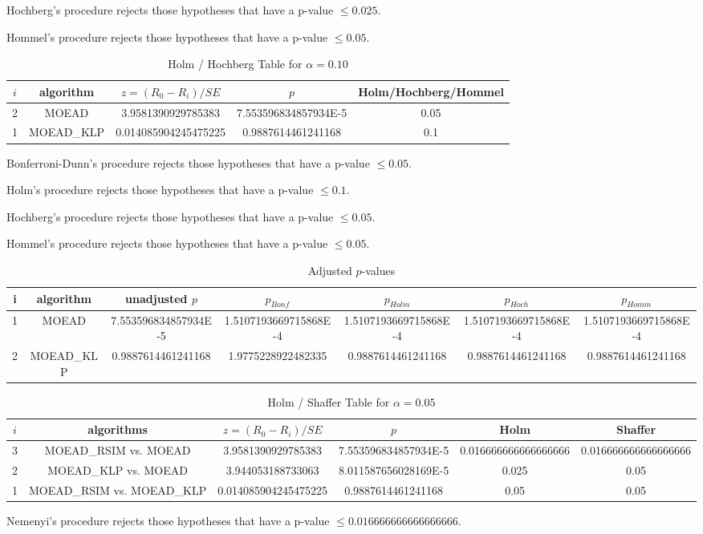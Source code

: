 \documentclass[a4paper,10pt]{article}
\begin{document}
\begin{landscape}
Hochberg's procedure rejects those hypotheses that have a p-value $\le0.025$.


Hommel's procedure rejects those hypotheses that have a p-value $\le0.05$.


\begin{table}[!htp]
\centering\tiny
\caption{Holm / Hochberg Table for $\alpha=0.10$}
\begin{tabular}{ccccc}
$i$&algorithm&$z=(R_0 - R_i)/SE$&$p$&Holm/Hochberg/Hommel\\
\hline
2&MOEAD&3.9581390929785383&7.553596834857934E-5&0.05\\
1&MOEAD_KLP&0.014085904245475225&0.9887614461241168&0.1\\
\hline
\end{tabular}
\end{table}
Bonferroni-Dunn's procedure rejects those hypotheses that have a p-value $\le0.05$.


Holm's procedure rejects those hypotheses that have a p-value $\le0.1$.


Hochberg's procedure rejects those hypotheses that have a p-value $\le0.05$.


Hommel's procedure rejects those hypotheses that have a p-value $\le0.05$.


\begin{table}[!htp]
\centering\tiny
\caption{Adjusted $p$-values}
\begin{tabular}{ccccccc}
i&algorithm&unadjusted $p$&$p_{Bonf}$&$p_{Holm}$&$p_{Hoch}$&$p_{Homm}$\\
\hline
1&MOEAD&7.553596834857934E-5&1.5107193669715868E-4&1.5107193669715868E-4&1.5107193669715868E-4&1.5107193669715868E-4\\
2&MOEAD_KLP&0.9887614461241168&1.9775228922482335&0.9887614461241168&0.9887614461241168&0.9887614461241168\\
\hline
\end{tabular}
\end{table}

\begin{table}[!htp]
\centering\tiny
\caption{Holm / Shaffer Table for $\alpha=0.05$}
\begin{tabular}{cccccc}
$i$&algorithms&$z=(R_0 - R_i)/SE$&$p$&Holm&Shaffer\\
\hline
3&MOEAD_RSIM vs. MOEAD&3.9581390929785383&7.553596834857934E-5&0.016666666666666666&0.016666666666666666\\
2&MOEAD_KLP vs. MOEAD&3.944053188733063&8.011587656028169E-5&0.025&0.05\\
1&MOEAD_RSIM vs. MOEAD_KLP&0.014085904245475225&0.9887614461241168&0.05&0.05\\
\hline
\end{tabular}
\end{table}
Nemenyi's procedure rejects those hypotheses that have a p-value $\le0.016666666666666666$.



\end{landscape}
\end{document}
